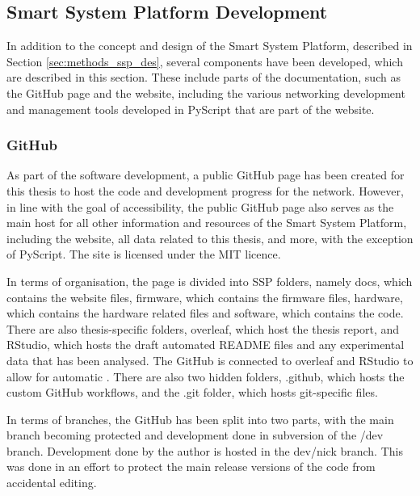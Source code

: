 \subsection{\label{sec:methods_ssp_dev}Smart System Platform Development}

In addition to the concept and design of the Smart System Platform, described in Section \ref{sec:methods_ssp_des}, several components have been developed, which are described in this section. These include parts of the documentation, such as the GitHub page and the website, including the various networking development and management tools developed in PyScript that are part of the website.

\subsubsection{\label{sec:methods_gh}GitHub}
As part of the software development, a public GitHub page has been created for this thesis to host the code and development progress for the network. However, in line with the goal of accessibility, the public GitHub page also serves as the main host for all other information and resources of the Smart System Platform, including the website, all data related to this thesis, and more, with the exception of PyScript. The site is licensed under the MIT licence. 

In terms of organisation, the page is divided into SSP folders, namely docs, which contains the website files, firmware, which contains the firmware files, hardware, which contains the hardware related files and software, which contains the code. There are also thesis-specific folders, overleaf, which host the thesis report, and RStudio, which hosts the draft automated README files and any experimental data that has been analysed. The GitHub is connected to overleaf and RStudio to allow for automatic . There are also two hidden folders, .github, which hosts the custom GitHub workflows, and the .git folder, which hosts git-specific files.

In terms of branches, the GitHub has been split into two parts, with the main branch becoming protected and development done in subversion of the /dev branch. Development done by the author is hosted in the dev/nick branch. This was done in an effort to protect the main release versions of the code from accidental editing.

